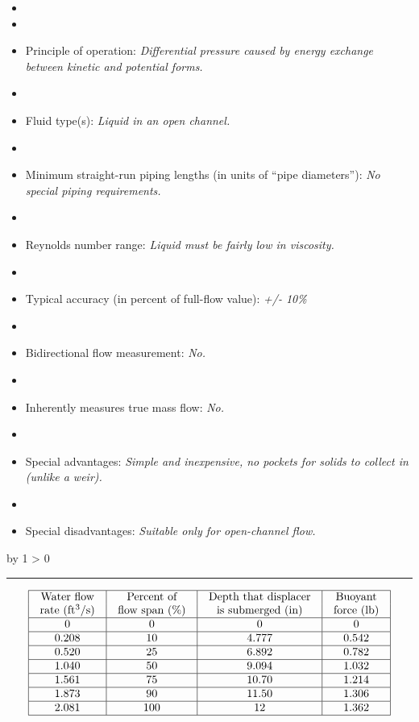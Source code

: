 \documentclass[12pt,a4paper]{article}
\def\svar{
           \advance\answnum by 1
           \ifnum \answnum > 0
                \hrule
                \vskip 3pt
                \leftline{Svar \the\answnum}
                \vskip 3pt \fi}
\begin{document}
\begin{itemize}
\goodbreak
\item{} 
\vskip 5pt
\item\item{} Principle of operation: {\it Differential pressure caused by energy exchange between kinetic and potential forms.}
\vskip 5pt
\item\item{} Fluid type(s): {\it Liquid in an open channel.}
\vskip 5pt
\item\item{} Minimum straight-run piping lengths (in units of ``pipe diameters''): {\it No special piping requirements.}
\vskip 5pt
\item\item{} Reynolds number range: {\it Liquid must be fairly low in viscosity.}
\vskip 5pt
\item\item{} Typical accuracy (in percent of full-flow value): {\it +/- 10\%}
\vskip 5pt
\item\item{} Bidirectional flow measurement: {\it No.}
\vskip 5pt
\item\item{} Inherently measures true mass flow: {\it No.}
\vskip 5pt
\item\item{} Special advantages: {\it Simple and inexpensive, no pockets for solids to collect in (unlike a weir).}
\vskip 5pt
\item\item{} Special disadvantages: {\it Suitable only for open-channel flow.}
\end{itemize}

\vskip 10pt \filbreak 
\svar{} 


$$\vbox{\offinterlineskip
\halign{\strut
\vrule \quad\hfil # \ \hfil & 
\vrule \quad\hfil # \ \hfil & 
\vrule \quad\hfil # \ \hfil & 
\vrule \quad\hfil # \ \hfil \vrule \cr
\noalign{\hrule}
%
Water flow & Percent of & Depth that displacer & Buoyant \cr
%
rate (ft$^{3}$/s) & flow span (\%) & is submerged (in) & force (lb) \cr
%
\noalign{\hrule}
%
0 & 0 & 0 & 0 \cr
%
\noalign{\hrule}
%
0.208 & 10 & 4.777 & 0.542 \cr
%
\noalign{\hrule}
%
0.520 & 25 & 6.892 & 0.782 \cr
%
\noalign{\hrule}
%
1.040 & 50 & 9.094 & 1.032 \cr
%
\noalign{\hrule}
%
1.561 & 75 & 10.70 & 1.214 \cr
%
\noalign{\hrule}
%
1.873 & 90 & 11.50 & 1.306 \cr
%
\noalign{\hrule}
%
2.081 & 100 & 12 & 1.362 \cr
%
\noalign{\hrule}
} %
}$$ %
\end{document}
